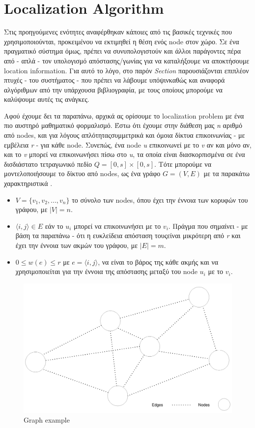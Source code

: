 \section{Localization Algorithm} \label{sec:Chapter2-3} 
Στις προηγούμενες ενότητες αναφέρθηκαν κάποιες από τις βασικές τεχνικές που χρησιμοποιούνται, 
προκειμένου να εκτιμηθεί η θέση ενός node στον χώρο. Σε ένα πραγματικό σύστημα όμως, πρέπει να συνυπολογιστούν 
και άλλοι παράγοντες πέρα από - απλά - τον υπολογισμό απόστασης/γωνίας για να καταλήξουμε να αποκτήσουμε location information. 
Για αυτό το λόγο, στο παρόν \emph{Section} παρουσιάζονται επιπλέον πτυχές - του συστήματος - που πρέπει να λάβουμε 
υπόψιν\udot καθώς και αναφορά αλγό\-ρι\-θμων από την υπάρχουσα βιβλιογραφία, με τους οποίους μπορούμε να καλύψουμε αυτές τις
ανάγκες. 

Αφού έχουμε δει τα παραπάνω, αρχικά ας ορίσουμε το localization problem με ένα πιο αυστηρό μαθηματικό φορμαλισμό.
Έστω ότι έχουμε στην διάθεση μας \emph{n} αριθμό από nodes, και για λόγους απλότητας\udot συμμετρικά και όμοια δίκτυα
επικοινωνίας - με εμβέλεια \emph{r} - για κάθε node. Συνεπώς, ένα node \emph{u} επικοινωνεί με το \emph{v} αν και μόνο αν, και το
\emph{v} μπορεί να επικοινωνήσει πίσω στο \emph{u}, τα οποία είναι δια\-σκο\-ρπι\-σμένα σε ένα δισδιάστατο τετραγωνικό
πεδίο \emph{$Q=[0,s]\times[0,s]$}. Τότε μπορούμε να μοντελοποιήσουμε το δίκτυο από nodes, ως ένα γράφο $G = (V, E)$ με τα 
παρακάτω χαρακτηριστικά \cite{wsn-Localization-systems}.  

\begin{itemize}
	\item $V = \{v_1, v_2, ..., v_n\}$ το σύνολο των nodes, όπου έχει την έννοια των κορυφών του γράφου, με $|V| = n$.
	\item $\langle i,j\rangle \in E$ εάν το $u_i$ μπορεί να επικοινωνήσει με το $v_i$. Πράγμα που σημαίνει - με βάση τα παραπάνω - 
	ότι η ευκλείδεια απόσταση τους\udot είναι μικρότερη από \emph{r} και έχει την έννοια των ακμών του γράφου, με $|E| = m$.
	\item $0 \le w(e) \le r$ με $e = \langle i,j\rangle$, να είναι το βάρος της κάθε ακμής και να χρησιμοποιείται για την έννοια της απόστασης
	μεταξύ του node $u_i$ με το $v_i$.
\end{itemize}

\begin{figure} [H]
	\centering
	\includegraphics[width=0.5\linewidth]{../Photos/localization-graph.png}
	\decoRule
	\caption[Graph example]{Graph example}
	\label{fig:Graph-example}
\end{figure}

